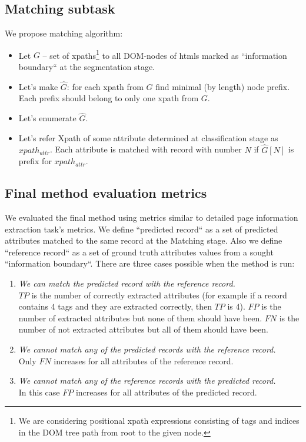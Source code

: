 \subsection{Matching subtask}
We propose matching algorithm:
\begin{itemize}
    \item Let $G$ -- set of xpaths\footnote{We are considering positional xpath expressions consisting of tags and indices in the DOM tree path from root to the given node.} to all DOM-nodes of htmls marked as ``information boundary`` at the segmentation stage.
    \item Let's make $\widehat{G}$: for each xpath from $G$ find minimal (by length) node prefix. Each prefix should belong to only one xpath from $G$.
    \item Let's enumerate $\widehat{G}$.
    \item  Let's refer Xpath of some attribute determined at classification stage as $xpath_{attr}$. Each attribute is matched with record with number $N$ if $\widehat{G}[N]$ is prefix for $xpath_{attr}$.
\end{itemize}


\subsection{Final method evaluation metrics}
We evaluated the final method using metrics similar to detailed page information extraction task's metrics. We define ``predicted record`` as a set of predicted attributes matched to the same record at the Matching stage. Also we define ``reference record`` as a set of ground truth attributes values from a sought ``information boundary``. There are three cases possible when the method is run:
\begin{enumerate}
    \item \textit{We can match the predicted record with the reference record.}\\ $TP$ is the number of correctly extracted attributes (for example if a record contains 4 tags and they are extracted correctly, then $TP$ is 4). $FP$ is the number of extracted attributes but none of them should have been. $FN$ is the number of not extracted attributes but all of them should have been.
    \item \textit{We cannot match any of the predicted records with the reference record.}\\ Only $FN$ increases for all attributes of the reference record.
    \item \textit{We cannot match any of the reference records with the predicted record.}\\ In this case $FP$ increases for all attributes of the predicted record.
\end{enumerate}

